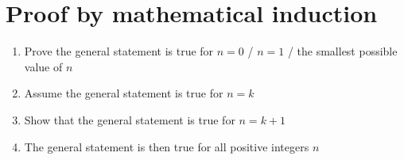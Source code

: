 \section{Proof by mathematical induction}
\begin{enumerate}
    \item Prove the general statement is true for $n=0$ / $n=1$ / the smallest possible value of $n$
    \item Assume the general statement is true for $n=k$
    \item Show that the general statement is true for $n=k+1$
    \item The general statement is then true for all positive integers $n$
\end{enumerate}
